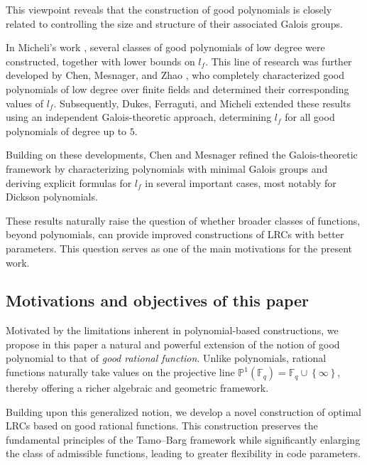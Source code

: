 \documentclass[1p,final]{elsarticle}
\newtheorem{open problem}[theorem]{Open Problem}
\begin{document}
This viewpoint reveals that the construction of good polynomials is closely related to controlling the size and structure of their associated Galois groups.

\medskip

In Micheli's work \cite{Micheli 2020}, several classes of good polynomials of low degree were constructed, together with lower bounds on $l_{f}$. This line of research was further developed by Chen, Mesnager, and Zhao \cite{Chen Mesnager zhao2021}, who completely characterized good polynomials of low degree over finite fields and determined their corresponding values of $l_{f}$. Subsequently, Dukes, Ferraguti, and Micheli \cite{Duke F M2022} extended these results using an independent Galois-theoretic approach, determining $l_{f}$ for all good polynomials of degree up to $5$.

Building on these developments, Chen and Mesnager \cite{Chen Mesnager 2022} refined the Galois-theoretic framework by characterizing polynomials with minimal Galois groups and deriving explicit formulas for $l_{f}$ in several important cases, most notably for Dickson polynomials.

\medskip

These results naturally raise the question of whether broader classes of functions, beyond polynomials, can provide improved constructions of LRCs with better parameters. This question serves as one of the main motivations for the present work.


\subsection{Motivations and objectives of this paper}

Motivated by the limitations inherent in polynomial-based constructions, we propose in this paper a natural and powerful extension of the notion of good polynomial to that of \emph{good rational function}. Unlike polynomials, rational functions naturally take values on the projective line $\mathbb{P}^{1}(\mathbb{F}_{q})=\mathbb{F}_{q}\cup \left \{ \infty  \right \}$, thereby offering a richer algebraic and geometric framework.

Building upon this generalized notion, we develop a novel construction of optimal LRCs based on good rational functions. This construction preserves the fundamental principles of the Tamo--Barg framework while significantly enlarging the class of admissible functions, leading to greater flexibility in code parameters.
\end{document}
